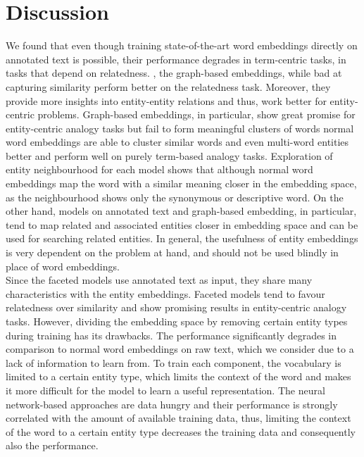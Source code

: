 \section{Discussion}
We found\deleted{,} that even though training  state-of-the-art word embeddings directly on annotated text is possible, their performance degrades in term-centric tasks,  in tasks that depend on relatedness. , the graph-based embeddings, while bad at capturing similarity\added{,} perform better on the relatedness task. Moreover, they provide more insights into entity-entity relations and thus, work better for entity-centric problems. Graph-based embeddings, in particular, show great promise for entity-centric analogy tasks but fail to form meaningful clusters of words  normal word embeddings are able to cluster similar words and even multi-word entities better and perform well on purely term-based analogy tasks. Exploration of entity neighbourhood for each model shows that although normal word embeddings map the word with a similar meaning closer in the embedding space, as the neighbourhood shows only the synonymous or descriptive word.
On the other hand, models on annotated text and graph-based embedding, in particular, tend to map related and associated entities closer in embedding space and can be used for searching  related entities. In general, the usefulness of entity embeddings is very dependent on the problem at hand, and should not be used blindly in place of word embeddings.
\\
Since the faceted models use annotated text as input, they share many characteristics with the entity embeddings. Faceted models tend to favour relatedness over similarity and show promising results in entity-centric analogy tasks. However, dividing the embedding space by removing certain entity types during training has its drawbacks. The performance significantly degrades in comparison to normal word embeddings on raw text, which we consider due to a lack of information to learn from. To train each component, the vocabulary is limited to a certain entity type, which limits the context of the word and makes it more difficult for the model to learn a useful representation. The neural network-based approaches are data hungry and their performance is strongly correlated with the amount of available training data, thus, limiting the context of the word to a certain entity type decreases the training data and consequently also the performance.
